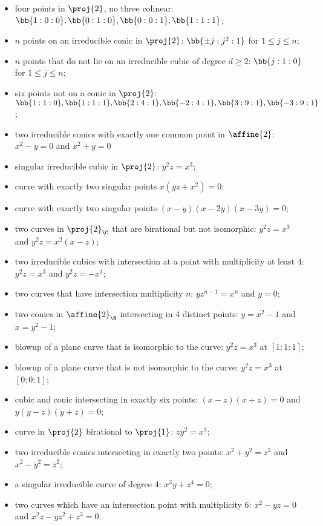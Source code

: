 \documentclass{article}
\begin{document}
\begin{itemize}
  \item four points in $\proj{2}$, no three colinear:
    $\bb{1:0:0},\bb{0:1:0},\bb{0:0:1},\bb{1:1:1}$;
  \item $n$ points on an irreducible conic in $\proj{2}$:
    $\bb{\pm j:j^2:1}$ for $1\leq j\leq n$;
  \item $n$ points that do not lie on an irreducible cubic of
    degree $d\geq 2$: $\bb{j:1:0}$ for $1\leq j\leq n$;
  \item six points not on a conic in $\proj{2}$:
    $\bb{1:1:0},\bb{1:1:1},\bb{2:4:1},\bb{-2:4:1},\bb{3:9:1},\bb{-3:9:1}$;
  \item two irreducible conics with exactly one common point in $\affine{2}$:
    $x^2 - y = 0$ and $x^2 + y = 0$
  \item singular irreducible cubic in $\proj{2}$: $y^2z=x^3$;
  \item curve with exactly two singular points
    $x(yz+x^2)=0$; 
  \item curve with exactly two singular points
    $(x-y)(x-2y)(x-3y)=0$; 
  \item two curves in $\proj{2}_{\C}$ that are birational but not
    isomorphic: $y^2z = x^3$ and $y^2z = x^2(x-z)$;
  \item two irreducible cubics with intersection at a point
    with multiplicity at least 4: $y^2z = x^3 $ and $y^2z = -x^3$;
  \item two curves that have intersection multiplicity $n$:
    $yz^{n-1}=x^n$ and $y=0$;
  \item two conics in $\affine{2}_\R$ intersecting in
    4 distinct points: $y = x^2 - 1$ and $x = y^2 - 1$;
  \item blowup of a plane curve that is isomorphic to the curve:
    $y^2z = x^3$ at $[1:1:1]$;
  \item blowup of a plane curve that is not isomorphic to the curve:
    $y^2z=x^3$ at $[0:0:1]$;
  \item cubic and conic intersecting in exactly six points:
    $(x-z)(x+z) = 0$ and $y(y-z)(y+z)=0$; 
  \item curve in $\proj{2}$ birational to $\proj{1}$:
    $zy^2 = x^3$;
  \item two irreducible conics intersecting in exactly two points:
    $x^2 + y^2 = z^2$ and $x^2 - y^2 = z^2$;
  \item a singular irreducible curve of degree 4: $x^3 y + z^4 = 0$;
  \item two curves which have an intersection point with multiplicity 6:
    $x^2 - yz = 0$ and $x^2 z - yz^2 + z^3 = 0$.
\end{itemize}
\end{document}
